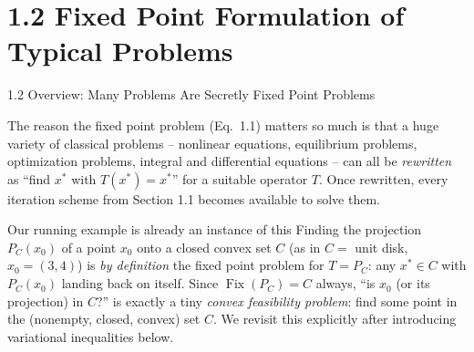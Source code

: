 \documentclass[aspectratio=169,10pt]{beamer}
\newcommand{\Fix}{\operatorname{Fix}}
\begin{document}
\section{1.2 Fixed Point Formulation of Typical Problems}

\begin{frame}{1.2 Overview: Many Problems Are Secretly Fixed Point Problems}

The reason the fixed point problem (Eq.\ 1.1) matters so much is that a
huge variety of classical problems -- nonlinear equations, equilibrium
problems, optimization problems, integral and differential equations --
can all be \emph{rewritten} as ``find $x^*$ with $T(x^*)=x^*$'' for a
suitable operator $T$. Once rewritten, every iteration scheme from
Section 1.1 becomes available to solve them.

\begin{block}{Our running example is already an instance of this}
Finding the projection $P_C(x_0)$ of a point $x_0$ onto a closed convex
set $C$ (as in $C=$ unit disk, $x_0=(3,4)$) is \emph{by definition} the
fixed point problem for $T=P_C$: any $x^*\in C$ with $P_C(x_0)$ landing
back on itself. Since $\Fix(P_C)=C$ always, ``is $x_0$ (or its projection)
in $C$?'' is exactly a tiny \emph{convex feasibility problem}: find some
point in the (nonempty, closed, convex) set $C$. We revisit this
explicitly after introducing variational inequalities below.
\end{block}

\end{frame}
\end{document}
